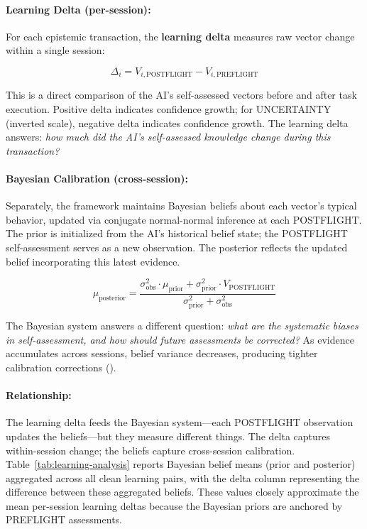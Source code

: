 \paragraph{Learning Delta (per-session):} For each epistemic transaction, the \textbf{learning delta} measures raw vector change within a single session:

\begin{equation}
\Delta_i = V_{i,\text{POSTFLIGHT}} - V_{i,\text{PREFLIGHT}}
\end{equation}

This is a direct comparison of the AI's self-assessed vectors before and after task execution. Positive delta indicates confidence growth; for UNCERTAINTY (inverted scale), negative delta indicates confidence growth. The learning delta answers: \emph{how much did the AI's self-assessed knowledge change during this transaction?}

\paragraph{Bayesian Calibration (cross-session):} Separately, the framework maintains Bayesian beliefs about each vector's typical behavior, updated via conjugate normal-normal inference at each POSTFLIGHT. The prior is initialized from the AI's historical belief state; the POSTFLIGHT self-assessment serves as a new observation. The posterior reflects the updated belief incorporating this latest evidence.

\begin{equation}
\mu_{\text{posterior}} = \frac{\sigma^2_{\text{obs}} \cdot \mu_{\text{prior}} + \sigma^2_{\text{prior}} \cdot V_{\text{POSTFLIGHT}}}{\sigma^2_{\text{prior}} + \sigma^2_{\text{obs}}}
\end{equation}

The Bayesian system answers a different question: \emph{what are the systematic biases in self-assessment, and how should future assessments be corrected?} As evidence accumulates across sessions, belief variance decreases, producing tighter calibration corrections ().

\paragraph{Relationship:} The learning delta feeds the Bayesian system---each POSTFLIGHT observation updates the beliefs---but they measure different things. The delta captures within-session change; the beliefs capture cross-session calibration. Table~\ref{tab:learning-analysis} reports Bayesian belief means (prior and posterior) aggregated across all clean learning pairs, with the delta column representing the difference between these aggregated beliefs. These values closely approximate the mean per-session learning deltas because the Bayesian priors are anchored by PREFLIGHT assessments.

